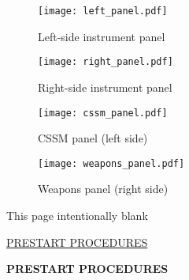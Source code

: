 \documentclass[a4paper,12pt]{memoir}
\begin{document}
\newpage
\begin{figure}[!h]
\centering
\texttt{[image: left\_panel.pdf]}
\caption{Left-side instrument panel}
\end{figure}
\newpage
\begin{figure}[!h]
\centering
\texttt{[image: right\_panel.pdf]}
\caption{Right-side instrument panel}
\end{figure}
\newpage
\begin{figure}[!h]
\centering
\texttt{[image: cssm\_panel.pdf]}
\caption{CSSM panel (left side)}
\end{figure}
\newpage
\begin{figure}[!h]
\centering
\texttt{[image: weapons\_panel.pdf]}
\caption{Weapons panel (right side)}
\end{figure}
\newpage
\begin{center}\begin{vplace}This page intentionally blank\end{vplace}\end{center}
\newpage
\begin{center}\begin{vplace}\underline{PRESTART PROCEDURES}\end{vplace}\end{center}
\newpage
\textbf{PRESTART PROCEDURES}
\end{document}
